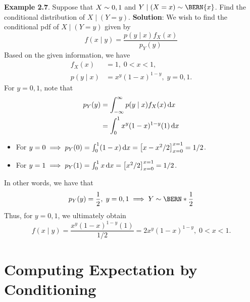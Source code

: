 \begin{Example}{}
    \textbf{Example 2.7}. Suppose that $ X \sim \relax{0,1} $ and $ Y\mid(X=x)\sim \BERN{x} $. Find the conditional distribution of $ X\mid(Y=y) $.
    \tcblower{}
    \textbf{Solution}: We wish to find the conditional pdf of $ X\mid (Y=y) $ given by
    \[ f(x\mid y)=\frac{p(y\mid x)f_X(x)}{p_Y(y)} \]
    Based on the given information, we have
    \begin{align*}
        f_X(x)     & =1,\;0<x<1,              \\
        p(y\mid x) & =x^y(1-x)^{1-y},\;y=0,1.
    \end{align*}
    For $ y=0,1 $, note that
    \begin{align*}
        p_Y(y)
         & =\int_{-\infty}^{\infty}p(y\mid x)f_X(x)\odif{x} \\
         & =\int_{0}^{1}x^y (1-x)^{1-y}(1)\odif{x}
    \end{align*}
    \begin{itemize}
        \item For $ y=0\implies p_Y(0)=\int_{0}^{1}(1-x)\odif{x}=\bigl[x-x^2/2\bigr]_{x=0}^{x=1}=1/2 $.
        \item For $ y=1\implies p_Y(1)=\int_{0}^{1}x\odif{x}=\bigl[x^2/2\bigr]_{x=0}^{x=1}=1/2 $.
    \end{itemize}
    In other words, we have that
    \[ p_Y(y)=\frac{1}{2} ,\; y=0,1\implies Y \sim \BERN*{\frac{1}{2} } \]
    Thus, for $ y=0,1 $, we ultimately obtain
    \[ f(x\mid y)=\frac{x^y(1-x)^{1-y}(1)}{1/2}=2x^y(1-x)^{1-y},\; 0<x<1. \]
\end{Example}
\section{Computing Expectation by Conditioning}
